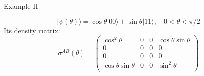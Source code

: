 \documentclass{beamer}
\begin{document}
\begin{frame}{Example-II}
\begin{scriptsize}
\begin{center}	
\end{center}
\begin{equation*}
|\psi(\theta)\rangle=\cos \theta|00\rangle+\sin \theta |11\rangle, \quad 0< \theta< \pi /2
\end{equation*}
Its density matrix:
\begin{equation*}
\sigma^{AB}(\theta)=\left(
\begin{array}{cccc}
 \cos ^2 \theta & 0 & 0 & \cos \theta \sin \theta \\
 0 & 0 & 0 & 0 \\
 0 & 0 & 0 & 0 \\
 \cos \theta \sin \theta & 0 & 0 & \sin ^2 \theta  \\
\end{array}
\right)
\end{equation*}
\end{scriptsize}
\end{frame}
\end{document}
